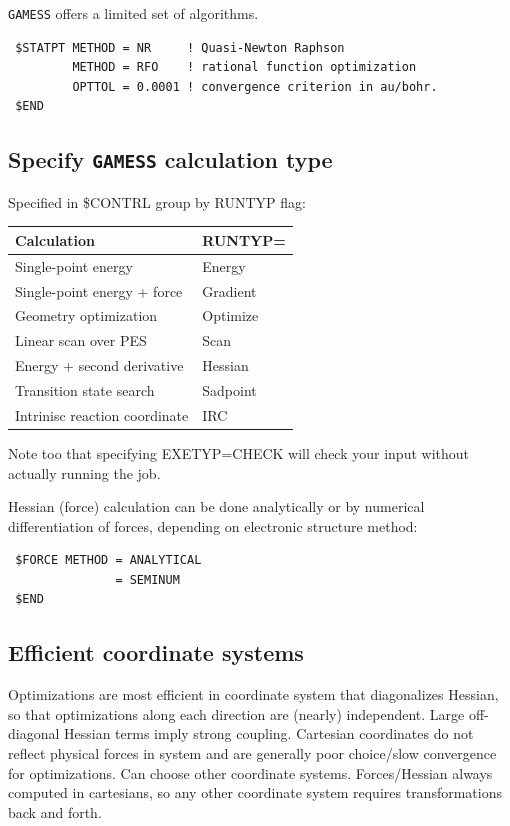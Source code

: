 \documentclass[11pt]{article}
\begin{document}
\texttt{GAMESS} offers a limited set of algorithms.
\begin{verbatim}
 $STATPT METHOD = NR     ! Quasi-Newton Raphson
         METHOD = RFO    ! rational function optimization
         OPTTOL = 0.0001 ! convergence criterion in au/bohr.
 $END
\end{verbatim}

\subsection{Specify \texttt{GAMESS} calculation type}
\label{sec:org7e87d15}
Specified in \$CONTRL group by RUNTYP flag:

\begin{center}
\begin{tabular}{ll}
Calculation & RUNTYP=\\
\hline
Single-point energy & Energy\\
Single-point energy + force & Gradient\\
Geometry optimization & Optimize\\
Linear scan over PES & Scan\\
Energy + second derivative & Hessian\\
Transition state search & Sadpoint\\
Intrinisc reaction coordinate & IRC\\
\end{tabular}
\end{center}

Note too that specifying EXETYP=CHECK will check your input without actually running the job.

Hessian (force) calculation can be done analytically or by numerical differentiation of forces, depending on electronic structure method:
\begin{verbatim}
 $FORCE METHOD = ANALYTICAL
               = SEMINUM
 $END
\end{verbatim}

\subsection{Efficient coordinate systems}
\label{sec:org89fbd15}
Optimizations are most efficient in coordinate system that diagonalizes Hessian, so that optimizations along each direction are (nearly) independent.  Large off-diagonal Hessian terms imply strong coupling.  Cartesian coordinates do not reflect physical forces in system and are generally poor choice/slow convergence for optimizations. Can choose other coordinate systems. Forces/Hessian always computed in cartesians, so any other coordinate system requires transformations back and forth.
\end{document}

